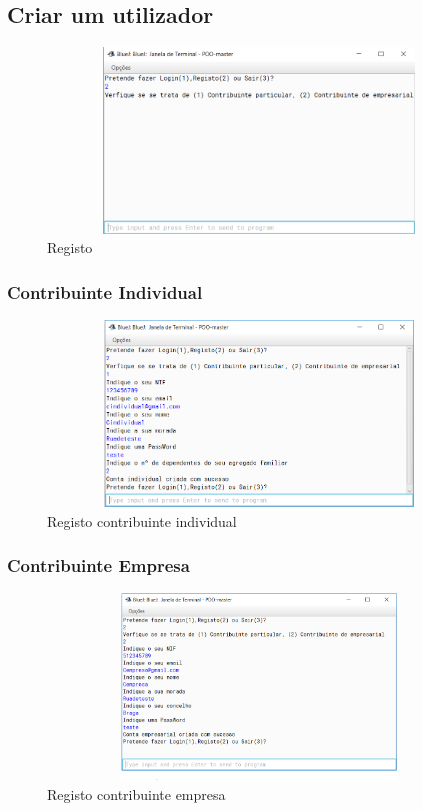 \documentclass[a4paper]{article}
\begin{document}
	\subsection{Criar um utilizador}
		\begin{figure}[H]
			\centering
			\includegraphics[width = 320pt,height = 140pt]{registo.png}
			\caption{Registo}
		\end{figure}

		\subsubsection{Contribuinte Individual}
			\begin{figure}[H]
				\centering
				\includegraphics[width = 320pt,height = 140pt]{CI.png}
				\caption{Registo contribuinte individual}
			\end{figure}

		\subsubsection{Contribuinte Empresa}
			\begin{figure}[H]
				\centering
				\includegraphics[width = 320pt,height = 140pt]{Ceregisto.png}
				\caption{Registo contribuinte empresa}
			\end{figure}
\end{document}
